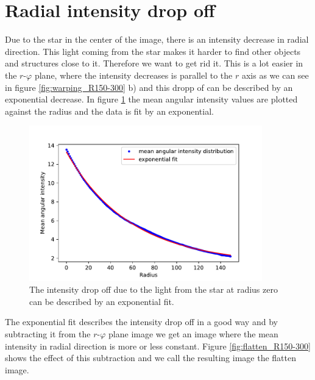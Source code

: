 \section{Radial intensity drop off}
Due to the star in the center of the image, there is an intensity decrease in radial direction. This light coming from the star makes it harder to find other objects and structures close to it. Therefore we want to get rid it. This is a lot easier in the $r$-$\varphi$ plane, where the intensity decreases is parallel to the $r$ axis as we can see in figure \ref{fig:warping_R150-300} b) and this dropp of can be described by an exponential decrease. In figure \ref{fig:mean_angular_intensity_R150_300} the mean angular intensity values are plotted against the radius and the data is fit by an exponential.
\begin{figure}[H]
	\centering
		\includegraphics[width=0.9\textwidth]{pics/mean_angular_intensity_R150_300.pdf}
\caption{The intensity drop off due to the light from the star at radius zero can be described by an exponential fit.}
\label{fig:mean_angular_intensity_R150_300}
\end{figure}
The exponential fit describes the intensity drop off in a good way and by subtracting it from the $r$-$\varphi$ plane image we get an image where the mean intensity in radial direction is more or less constant. Figure \ref{fig:flatten_R150-300} shows the effect of this subtraction and we call the resulting image the flatten image.  
